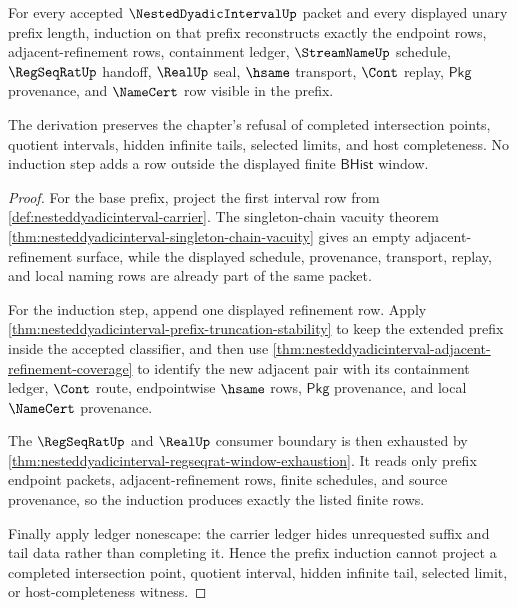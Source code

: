 \begin{theorem}
\label{thm:nested-dyadic-interval-prefix-induction-derivation}
For every accepted $\NestedDyadicIntervalUp$ packet and every displayed unary
prefix length, induction on that prefix reconstructs exactly the endpoint rows,
adjacent-refinement rows, containment ledger, $\StreamNameUp$ schedule,
$\RegSeqRatUp$ handoff, $\RealUp$ seal, $\hsame$ transport, $\Cont$ replay,
$\mathsf{Pkg}$ provenance, and $\NameCert$ row visible in the prefix.

The derivation preserves the chapter's refusal of completed intersection
points, quotient intervals, hidden infinite tails, selected limits, and host
completeness. No induction step adds a row outside the displayed finite
$\mathsf{BHist}$ window.
\end{theorem}
\begin{proof}
For the base prefix, project the first interval row from
\autoref{def:nesteddyadicinterval-carrier}. The singleton-chain vacuity theorem
\autoref{thm:nesteddyadicinterval-singleton-chain-vacuity} gives an empty
adjacent-refinement surface, while the displayed schedule, provenance,
transport, replay, and local naming rows are already part of the same packet.

For the induction step, append one displayed refinement row. Apply
\autoref{thm:nesteddyadicinterval-prefix-truncation-stability} to keep the
extended prefix inside the accepted classifier, and then use
\autoref{thm:nesteddyadicinterval-adjacent-refinement-coverage} to identify the
new adjacent pair with its containment ledger, $\Cont$ route, endpointwise
$\hsame$ rows, $\mathsf{Pkg}$ provenance, and local $\NameCert$ provenance.

The $\RegSeqRatUp$ and $\RealUp$ consumer boundary is then exhausted by
\autoref{thm:nesteddyadicinterval-regseqrat-window-exhaustion}. It reads only
prefix endpoint packets, adjacent-refinement rows, finite schedules, and source
provenance, so the induction produces exactly the listed finite rows.

Finally apply ledger nonescape: the carrier ledger hides unrequested suffix and
tail data rather than completing it. Hence the prefix induction cannot project a
completed intersection point, quotient interval, hidden infinite tail, selected
limit, or host-completeness witness.
\end{proof}

